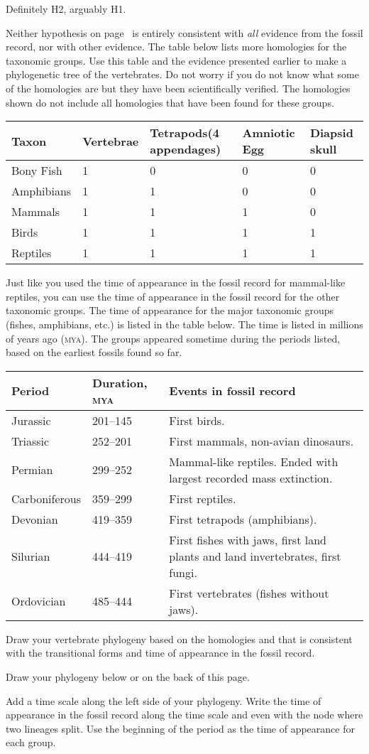 \documentclass[12pt, hidelinks]{exam}
\newcommand*\AnswerBox[2]{%
    \parbox[t][#1]{0.92\textwidth}{%
    \begin{solution}#2\end{solution}}
    \vspace{\stretch{1}}
}
\begin{document}
\begin{questions}
\AnswerBox{2\baselineskip}{Definitely H2, arguably H1.}

Neither hypothesis on page~\pageref{hypothesis1} is entirely consistent with \emph{all} evidence from the fossil record, nor with other evidence. The table below lists more homologies for the taxonomic groups. Use this table and the evidence presented earlier to make a phylogenetic tree of the vertebrates. Do not worry if you do not know what some of the homologies are but they have been scientifically verified. The homologies shown do not include all homologies that have been found for these groups.

\begin{longtable}[c]{@{}L{1in}C{1in}C{1in}C{1in}C{1in}@{}}
	\toprule
	Taxon 				&	Vertebrae	& Tetrapods\newline(4 appendages)	&	Amniotic Egg	& Diapsid skull \tabularnewline
	\midrule
	Bony Fish			& 1				&	0							& 0 						& 0 \tabularnewline
	Amphibians		& 1				&	1							& 0 						& 0 \tabularnewline
	Mammals			& 1				&	1							& 1 						& 0 \tabularnewline
	Birds					& 1				&	1							& 1 						& 1 \tabularnewline
	Reptiles			& 1				&	1							& 1 						& 1 \tabularnewline
	\bottomrule
\end{longtable}

\newpage

Just like you used the time of appearance in the fossil record for mammal-like reptiles, you can use the time of appearance in the fossil record for the other taxonomic groups. The time of appearance for the major taxonomic groups (fishes, amphibians, etc.) is listed in the table below. The time is listed in millions of years ago (\textsc{mya}). The groups appeared sometime during the periods listed, based on the earliest fossils found so far.

\begin{longtable}[c]{@{}L{1in}L{1.5in}L{2.5in}@{}}
\toprule
Period	& Duration, \textsc{mya} 	&	Events in fossil record \tabularnewline
\midrule
Jurassic			&	201–145	&	First birds.  \tabularnewline
Triassic				&	252–201	&	First mammals, non-avian dinosaurs. \tabularnewline
Permian			&	299–252	&	Mammal-like reptiles. Ended with largest recorded mass extinction. \tabularnewline
Carboniferous	&	359–299	&	First reptiles. \tabularnewline
Devonian			&	419–359	&	First tetrapods (amphibians). \tabularnewline
Silurian				&	444–419	&	First fishes with jaws, first land plants and land invertebrates, first fungi. \tabularnewline
Ordovician		&	485–444	&	First vertebrates (fishes without jaws). \tabularnewline
\bottomrule
\end{longtable}

\question
Draw your vertebrate phylogeny based on the homologies and that is consistent with the transitional forms and time of appearance in the fossil record. 

Draw your phylogeny below or on the back of this page.

\question
Add a time scale along the left side of your phylogeny. Write the time of appearance in the fossil record along the time scale and even with the node where two lineages split. Use the beginning of the period as the time of appearance for each group.


\end{questions}
\end{document}
